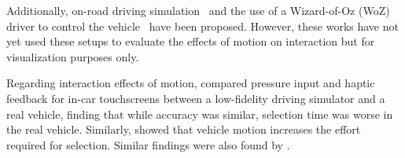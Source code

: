 Additionally, on-road driving simulation~\cite{goedicke_vr-oom_2018, bu2024portobello, mcgill20222passengxr, goedicke2022xroom} and the use of a Wizard-of-Oz (WoZ) driver to control the vehicle~\cite{baltodano_rrads_2015, detjen2020wizard} have been proposed. However, these works have not yet used these setups to evaluate the effects of motion on interaction but for visualization purposes only.

Regarding interaction effects of motion, \citet{ng2016investigating} compared pressure input and haptic feedback for in-car touchscreens between a low-fidelity driving simulator and a real vehicle, finding that while accuracy was similar, selection time was worse in the real vehicle. Similarly, \citet{ahmadTouchscreenUsabilityInput2015} showed that vehicle motion increases the effort required for selection. Similar findings were also found by \citet{goode_impact_nodate, salmon_effects_2011, kim_evaluation_2014}.